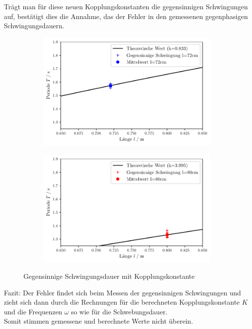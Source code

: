 Trägt man für diese neuen Kopplungskonstanten die gegensinnigen Schwingungen auf, bestätigt dies die Annahme,
das der Fehler in den gemessenen gegenphasigen Schwingungsdauern.  
\begin{figure}
    \begin{subfigure}[c]{0.5\textwidth}
        \includegraphics[width=\textwidth]{plots/plot4.pdf}
    \end{subfigure}
    \begin{subfigure}[c]{0.5\textwidth}
        \includegraphics[width=\textwidth]{plots/plot5.pdf}
        \label{subfig:gegenNEU80}
    \end{subfigure}
    \caption{Gegensinnige Schwingungsdauer mit Kopplungskonstante}
\end{figure}

Fazit: Der Fehler findet sich beim Messen der gegensinnigen Schwingungen und
zieht sich dann durch die Rechnungen für die berechneten Kopplungskonstante $K$ und die Frequenzen $\omega$
so wie für die Schwebungsdauer.\\
Somit stimmen gemessene und berechnete Werte nicht überein.



